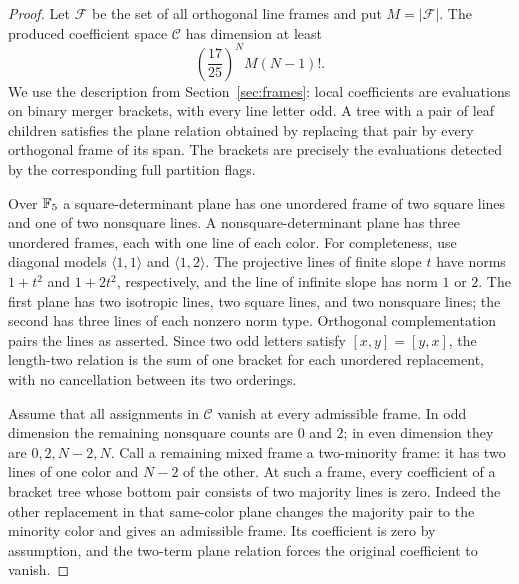 \begin{proof}
Let $\mathcal F$ be the set of all orthogonal line frames and put
$M=|\mathcal F|$.  The produced coefficient space $\mathcal C$ has
dimension at least
\begin{equation}\label{eq:orthogonal-all-lower}
 \left(\frac{17}{25}\right)^N M(N-1)!.
\end{equation}
We use the description from Section~\ref{sec:frames}: local
coefficients are evaluations on binary merger brackets, with every
line letter odd.  A tree with a pair of leaf children satisfies the
plane relation obtained by replacing that pair by every orthogonal
frame of its span.  The brackets are precisely the evaluations detected
by the corresponding full partition flags.

Over $\mathbb F_5$ a square-determinant plane has one unordered frame of two
square lines and one of two nonsquare lines.  A nonsquare-determinant
plane has three unordered frames, each with one line of each color.
For completeness, use diagonal models $\langle1,1\rangle$ and
$\langle1,2\rangle$.  The projective lines of finite slope $t$ have
norms $1+t^2$ and $1+2t^2$, respectively, and the line of infinite slope
has norm $1$ or $2$.  The first plane has two isotropic lines, two
square lines, and two nonsquare lines; the second has three lines of
each nonzero norm type.  Orthogonal complementation pairs the lines
as asserted.  Since two odd letters satisfy $[x,y]=[y,x]$, the
length-two relation is the sum of one bracket for each unordered
replacement, with no cancellation between its two orderings.

Assume that all assignments in $\mathcal C$ vanish at every admissible
frame.  In odd dimension the remaining nonsquare counts are $0$ and
$2$; in even dimension they are $0,2,N-2,N$.  Call a remaining mixed
frame a two-minority frame: it has two lines of one color and $N-2$
of the other.  At such a frame, every coefficient of a bracket tree
whose bottom pair consists of two majority lines is zero.  Indeed the
other replacement in that same-color plane changes the majority pair
to the minority color and gives an admissible frame.  Its coefficient
is zero by assumption, and the two-term plane relation forces the
original coefficient to vanish.


\end{proof}
